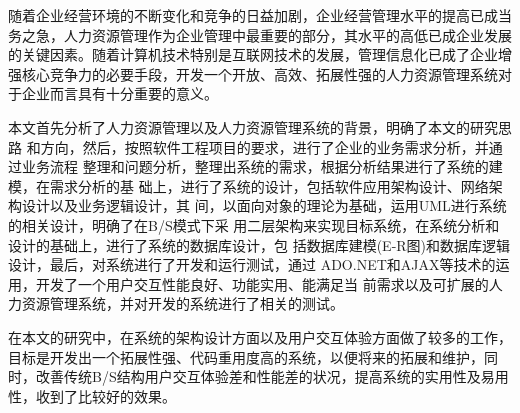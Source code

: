 \begin{cnabstract}
随着企业经营环境的不断变化和竞争的日益加剧，企业经营管理水平的提高已成当务之急，人力资源管理作为企业管理中最重要的部分，其水平的高低已成企业发展的关键因素。随着计算机技术特别是互联网技术的发展，管理信息化已成了企业增强核心竞争力的必要手段，开发一个开放、高效、拓展性强的人力资源管理系统对于企业而言具有十分重要的意义。

本文首先分析了人力资源管理以及人力资源管理系统的背景，明确了本文的研究思路\linebreak
和方向，然后，按照软件工程项目的要求，进行了企业的业务需求分析，并通过业务流程\linebreak
整理和问题分析，整理出系统的需求，根据分析结果进行了系统的建模，在需求分析的基\linebreak
础上，进行了系统的设计，包括软件应用架构设计、网络架构设计以及业务逻辑设计，其\linebreak
间，以面向对象的理论为基础，运用\hspace{3.72bp}UML\hspace{3.72bp}进行系统的相关设计，明确了在\hspace{3.72bp}B/S\hspace{3.72bp}模式下采\linebreak
用二层架构来实现目标系统，在系统分析和设计的基础上，进行了系统的数据库设计，包\linebreak
括数据库建模\hspace{0bp plus0.96bp}(E-R\hspace{6bp plus0.96bp}图)\hspace{0bp plus0.96bp}和数据库逻辑设计，最后，对系统进行了开发和运行测试，通过\linebreak
ADO.NET\hspace{4.2bp}和\hspace{4.2bp}AJAX\hspace{4.2bp}等技术的运用，开发了一个用户交互性能良好、功能实用、能满足当\linebreak
前需求以及可扩展的人力资源管理系统，并对开发的系统进行了相关的测试。

在本文的研究中，在系统的架构设计方面以及用户交互体验方面做了较多的工作，目标是开发出一个拓展性强、代码重用度高的系统，以便将来的拓展和维护，同时，改善传统B/S结构用户交互体验差和性能差的状况，提高系统的实用性及易用性，收到了比较好的效果。

\end{cnabstract}

